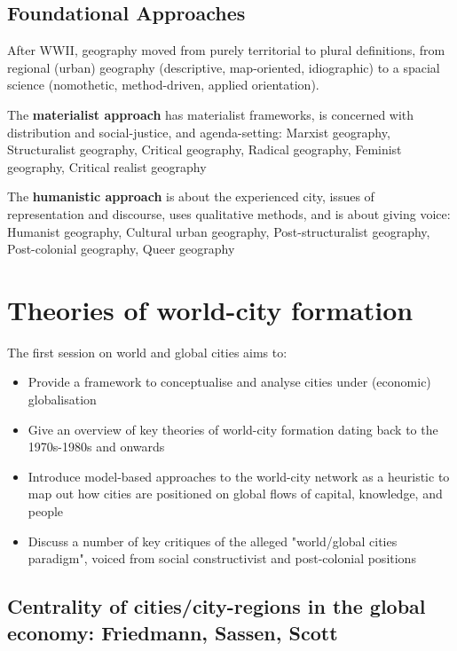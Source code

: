 \documentclass{article}
\begin{document}
\subsection{Foundational Approaches}

After WWII, geography moved from purely territorial to plural definitions, from regional (urban) geography (descriptive, map-oriented, idiographic) to a spacial science (nomothetic, method-driven, applied orientation).

The \textbf{materialist approach} has materialist frameworks, is concerned with distribution and social-justice, and agenda-setting: Marxist geography, Structuralist geography, Critical geography, Radical geography, Feminist geography, Critical realist geography

The \textbf{humanistic approach} is about the experienced city, issues of representation and discourse, uses qualitative methods, and is about giving voice: Humanist geography, Cultural urban geography, Post-structuralist geography, Post-colonial geography, Queer geography


\pagebreak\section{Theories of world-city formation}
\date{Octobre 4th, 2021}

The first session on world and global cities aims to:
\begin{itemize}
  \item Provide a framework to conceptualise and analyse cities under (economic) globalisation
  \item Give an overview of key theories of world-city formation dating back to the 1970s-1980s and onwards
  \item Introduce model-based approaches to the world-city network as a heuristic to map out how cities are positioned on global flows of capital, knowledge, and people
  \item Discuss a number of key critiques of the alleged "world/global cities paradigm", voiced from social constructivist and post-colonial positions
\end{itemize}

\subsection{Centrality of cities/city-regions in the global economy: Friedmann, Sassen, Scott}
\end{document}
